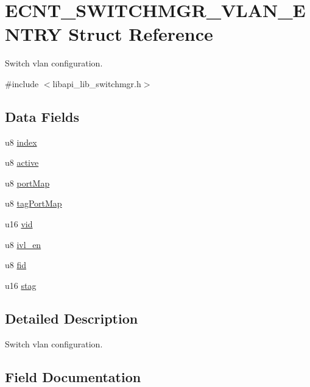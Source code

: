 \hypertarget{structECNT__SWITCHMGR__VLAN__ENTRY}{}\section{E\+C\+N\+T\+\_\+\+S\+W\+I\+T\+C\+H\+M\+G\+R\+\_\+\+V\+L\+A\+N\+\_\+\+E\+N\+T\+RY Struct Reference}
\label{structECNT__SWITCHMGR__VLAN__ENTRY}


Switch vlan configuration.  




{\ttfamily \#include $<$libapi\+\_\+lib\+\_\+switchmgr.\+h$>$}

\subsection*{Data Fields}
\begin{DoxyCompactItemize}
\item 
u8 \hyperlink{structECNT__SWITCHMGR__VLAN__ENTRY_ae1d0295dfd17c1dd755a9e90bb40d3f9}{index}
\item 
u8 \hyperlink{structECNT__SWITCHMGR__VLAN__ENTRY_a9a08400c938b6c43998b899d2e37601a}{active}
\item 
u8 \hyperlink{structECNT__SWITCHMGR__VLAN__ENTRY_a3869aa0d1e5e7338fbb828ab485524a4}{port\+Map}
\item 
u8 \hyperlink{structECNT__SWITCHMGR__VLAN__ENTRY_a27493d09168538cc67bb4c11a2c9d77c}{tag\+Port\+Map}
\item 
u16 \hyperlink{structECNT__SWITCHMGR__VLAN__ENTRY_a02c99272ffabf1368d0ccc58d75fe95a}{vid}
\item 
u8 \hyperlink{structECNT__SWITCHMGR__VLAN__ENTRY_a28e8ac71c1a2b3a3307c678009e08645}{ivl\+\_\+en}
\item 
u8 \hyperlink{structECNT__SWITCHMGR__VLAN__ENTRY_a271f45d6419253c55514e9a7d485b95a}{fid}
\item 
u16 \hyperlink{structECNT__SWITCHMGR__VLAN__ENTRY_a654b3d5537b72c95d90639bfd9d92ddf}{stag}
\end{DoxyCompactItemize}


\subsection{Detailed Description}
Switch vlan configuration. 

\subsection{Field Documentation}
\mbox{\label{structECNT__SWITCHMGR__VLAN__ENTRY_a9a08400c938b6c43998b899d2e37601a}} 
